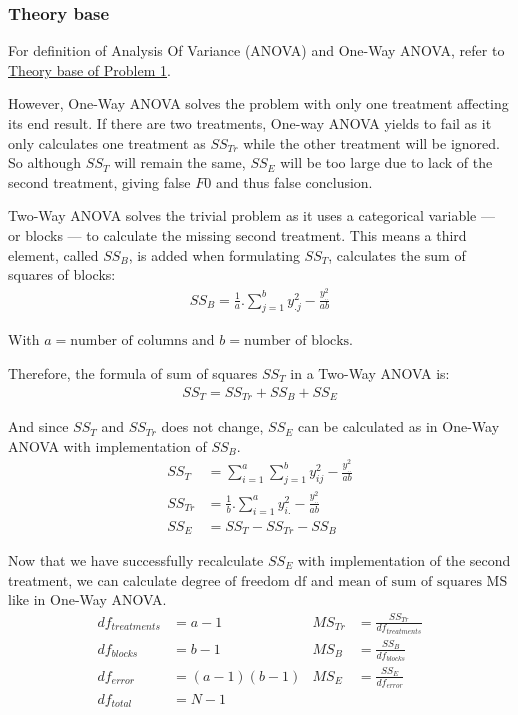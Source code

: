 \documentclass[a4paper]{article}
\numberwithin{equation}{section}
\begin{document}
\subsubsection{Theory base}
For definition of Analysis Of Variance (ANOVA) and One-Way ANOVA, refer to \hyperref[anovaDef]{\underline{Theory base of Problem 1}}.

However, One-Way ANOVA solves the problem with only one treatment affecting its end result. If there are two treatments, One-way ANOVA yields to fail as it only calculates one treatment as \(SS_{Tr}\) while the other treatment will be ignored. So although \(SS_{T}\) will remain the same, \(SS_{E}\) will be too large due to lack of the second treatment, giving false \(F0\) and thus false conclusion.

Two-Way ANOVA solves the trivial problem as it uses a categorical variable --- or blocks --- to calculate the missing second treatment. This means a third element, called \(SS_{B}\), is added when formulating \(SS_{T}\),  calculates the sum of squares of blocks:
\begin{align*}
  SS_{B} = \frac{1}{a}.\sum_{j=1}^{b}y^2_{.j} - \frac{y^2_{..}}{ab}
\end{align*}

With \(a = \text{number of columns}\) and \(b = \text{number of blocks}\).

Therefore, the formula of sum of squares \(SS_{T}\) in a Two-Way ANOVA is:
\begin{align*}
  SS_{T} = SS_{Tr} + SS_{B} + SS_{E}
\end{align*}

And since \(SS_{T}\) and \(SS_{Tr}\) does not change, \(SS_{E}\) can be calculated as in One-Way ANOVA with implementation of \(SS_{B}\).
\begin{align*}
  SS_{T}  & = \sum_{i=1}^{a}\sum_{j=1}^{b}y^2_{ij} - \frac{y^2_{..}}{ab} \\
  SS_{Tr} & = \frac{1}{b}.\sum_{i=1}^{a}y^2_{i.} - \frac{y^2_{..}}{ab}   \\
  SS_{E}  & = SS_{T} - SS_{Tr} - SS_{B}
\end{align*}

Now that we have successfully recalculate \(SS_{E}\) with implementation of the second treatment, we can calculate \(\text{degree of freedom df}\) and \(\text{mean of sum of  squares MS}\) like in One-Way ANOVA.\
\begin{align*}
  df_{treatments} & = a - 1      & MS_{Tr} & = \frac{SS_{Tr}}{df_{treatments}} \\
  df_{blocks}     & = b - 1      & MS_{B}  & = \frac{SS_{B}}{df_{blocks}}      \\
  df_{error}      & = (a-1)(b-1) & MS_{E}  & = \frac{SS_{E}}{df_{error}}       \\
  df_{total}      & = N-1
\end{align*}
\end{document}
